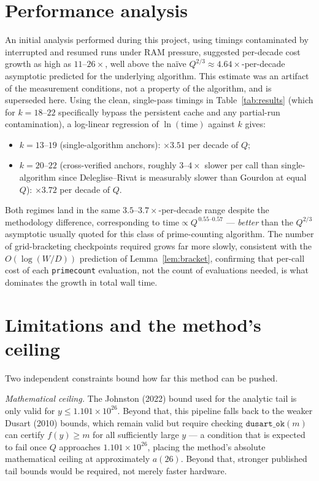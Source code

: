 \documentclass[11pt]{amsart}
\begin{document}
\section{Performance analysis}
\label{sec:performance}

An initial analysis performed during this project, using timings
contaminated by interrupted and resumed runs under RAM pressure,
suggested per-decade cost growth as high as $11$--$26\times$, well above
the na\"ive $Q^{2/3} \approx 4.64\times$-per-decade asymptotic predicted
for the underlying algorithm. This estimate was an artifact of the
measurement conditions, not a property of the algorithm, and is
superseded here. Using the clean, single-pass timings in
Table~\ref{tab:results} (which for $k=18$--$22$ specifically bypass the
persistent cache and any partial-run contamination), a log-linear
regression of $\ln(\text{time})$ against $k$ gives:

\begin{itemize}
  \item $k=13$--$19$ (single-algorithm anchors): $\times3.51$ per decade of $Q$;
  \item $k=20$--$22$ (cross-verified anchors, roughly $3$--$4\times$
  slower per call than single-algorithm since Deleglise--Rivat is
  measurably slower than Gourdon at equal $Q$): $\times3.72$ per decade of $Q$.
\end{itemize}

Both regimes land in the same $3.5$--$3.7\times$-per-decade range despite
the methodology difference, corresponding to $\text{time} \propto
Q^{\,0.55\text{--}0.57}$ --- \emph{better} than the $Q^{2/3}$ asymptotic
usually quoted for this class of prime-counting algorithm. The number of
grid-bracketing checkpoints required grows far more slowly, consistent
with the $O(\log(W/D))$ prediction of Lemma~\ref{lem:bracket}, confirming
that per-call cost of each \texttt{primecount} evaluation, not the count
of evaluations needed, is what dominates the growth in total wall time.

\section{Limitations and the method's ceiling}
\label{sec:ceiling}

Two independent constraints bound how far this method can be pushed.

\emph{Mathematical ceiling.} The Johnston (2022) bound used for the
analytic tail is only valid for $y \leq 1.101\times10^{26}$. Beyond that,
this pipeline falls back to the weaker Dusart (2010) bounds, which remain
valid but require checking $\texttt{dusart\_ok}(m)$ can certify $f(y)
\geq m$ for all sufficiently large $y$ --- a condition that is expected
to fail once $Q$ approaches $1.101\times10^{26}$, placing the method's
absolute mathematical ceiling at approximately $a(26)$. Beyond that,
stronger published tail bounds would be required, not merely faster
hardware.
\end{document}
